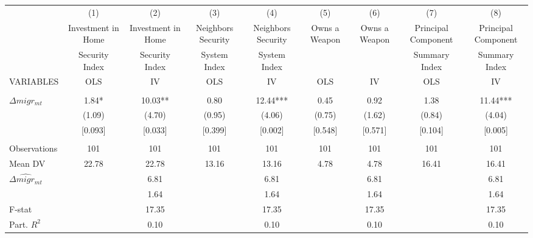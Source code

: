 \begin{tabular}{lcccccccc} \hline
 & (1) & (2) & (3) & (4) & (5) & (6) & (7) & (8) \\
 & Investment in Home & Investment in Home & Neighbors Security & Neighbors Security & Owns a Weapon & Owns a Weapon & Principal Component & Principal Component \\
 & Security Index & Security Index & System Index & System Index &  &  & Summary Index & Summary Index \\
VARIABLES & OLS & IV & OLS & IV & OLS & IV & OLS & IV \\ \hline
 &  &  &  &  &  &  &  &  \\
$\Delta migr_{mt}$ & 1.84* & 10.03** & 0.80 & 12.44*** & 0.45 & 0.92 & 1.38 & 11.44*** \\
 & (1.09) & (4.70) & (0.95) & (4.06) & (0.75) & (1.62) & (0.84) & (4.04) \\
 & [0.093] & [0.033] & [0.399] & [0.002] & [0.548] & [0.571] & [0.104] & [0.005] \\
 &  &  &  &  &  &  &  &  \\
Observations & 101 & 101 & 101 & 101 & 101 & 101 & 101 & 101 \\
Mean DV & 22.78 & 22.78 & 13.16 & 13.16 & 4.78 & 4.78 & 16.41 & 16.41 \\
$ \widehat{\Delta migr_{mt}} $ &  & 6.81 &  & 6.81 &  & 6.81 &  & 6.81 \\
\hspace{1cm} &  & 1.64 &  & 1.64 &  & 1.64 &  & 1.64 \\
F-stat &  & 17.35 &  & 17.35 &  & 17.35 &  & 17.35 \\
 Part. $ R^2 $ &  & 0.10 &  & 0.10 &  & 0.10 &  & 0.10 \\ \hline
\end{tabular}
